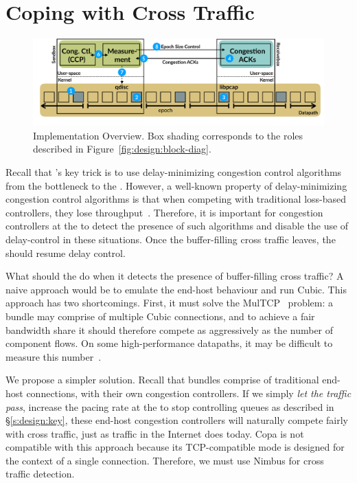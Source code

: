 \section{Coping with Cross Traffic}\label{s:queue-ctl}
\begin{figure}[t]
    \centering
    \includegraphics[width=2\columnwidth]{img/bundler-diagram}
    \vspace{-10pt}
    \caption{\name Implementation Overview. Box shading corresponds to the roles described in Figure~\ref{fig:design:block-diag}.}\label{fig:bundler}
\end{figure}


Recall that \name's key trick is to use delay-minimizing congestion control algorithms from the bottleneck to the \inbox.
However, a well-known property of delay-minimizing congestion control algorithms is that when competing with traditional loss-based  controllers, they lose throughput~\cite{copa}.
Therefore, it is important for congestion controllers at the \inbox to detect the presence of such algorithms and disable the use of delay-control in these situations.
Once the buffer-filling cross traffic leaves, the \inbox should resume delay control.

What should the \inbox do when it detects the presence of buffer-filling cross traffic?
A naive approach would be to emulate the end-host behaviour and run Cubic. This approach has two shortcomings.
First, it must solve the MulTCP~\cite{multcp} problem: a bundle may comprise of multiple Cubic connections, and to achieve a fair bandwidth share it should therefore compete as aggressively as the number of component flows. 
On some high-performance datapaths, it may be difficult to measure this number~\cite{heavy-hitters}.

We propose a simpler solution.
Recall that bundles comprise of traditional end-host connections, with their own congestion controllers. 
If we simply \emph{let the traffic pass}, \ie increase the pacing rate at the \inbox to stop controlling queues as described in \S\ref{s:design:key}, these end-host congestion controllers will naturally compete fairly with cross traffic, just as traffic in the Internet does today.
Copa is not compatible with this approach because its TCP-compatible mode is designed for the context of a single connection. Therefore, we must use Nimbus for cross traffic detection.

